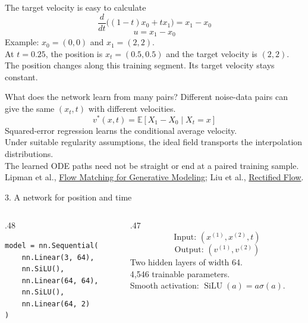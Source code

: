 \documentclass[aspectratio=169,11pt]{beamer}
\newcommand{\fmref}{\vfill{\tiny\color{gray}Lipman et al., \href{https://arxiv.org/abs/2210.02747}{Flow Matching for Generative Modeling}; Liu et al., \href{https://arxiv.org/abs/2209.03003}{Rectified Flow}.}}
\begin{document}
\begin{frame}{The target velocity is easy to calculate}
\large
\[\frac{d}{dt}\bigl((1-t)x_0+tx_1\bigr)=x_1-x_0\]
\[\boxed{u=x_1-x_0}\]
\normalsize
\vspace{3mm}
Example: $x_0=(0,0)$ and $x_1=(2,2)$.\\[3mm]
At $t=0.25$, the position is $x_t=(0.5,0.5)$ and the target velocity is $(2,2)$.\\[4mm]
The position changes along this training segment. Its target velocity stays constant.
\end{frame}

\begin{frame}{What does the network learn from many pairs?}
Different noise-data pairs can give the same $(x_t,t)$ with different velocities.
\vspace{4mm}
\large
\[v^*(x,t)=\mathbb E[X_1-X_0\mid X_t=x]\]
\normalsize
\vspace{4mm}
Squared-error regression learns the conditional average velocity.\\[3mm]
Under suitable regularity assumptions, the ideal field transports the interpolation distributions.\\[3mm]
The learned ODE paths need not be straight or end at a paired training sample.
\fmref
\end{frame}

\begin{frame}[fragile]{3. A network for position and time}
\begin{columns}[c]
\begin{column}{.48\textwidth}
\begin{lstlisting}
model = nn.Sequential(
    nn.Linear(3, 64),
    nn.SiLU(),
    nn.Linear(64, 64),
    nn.SiLU(),
    nn.Linear(64, 2)
)
\end{lstlisting}
\end{column}
\begin{column}{.47\textwidth}
\[\text{Input: }(x^{(1)},x^{(2)},t)\]
\[\text{Output: }(v^{(1)},v^{(2)})\]
\small
Two hidden layers of width 64.\\[3mm]
4,546 trainable parameters.\\[3mm]
Smooth activation: $\operatorname{SiLU}(a)=a\sigma(a)$.
\end{column}
\end{columns}
\end{frame}
\end{document}
